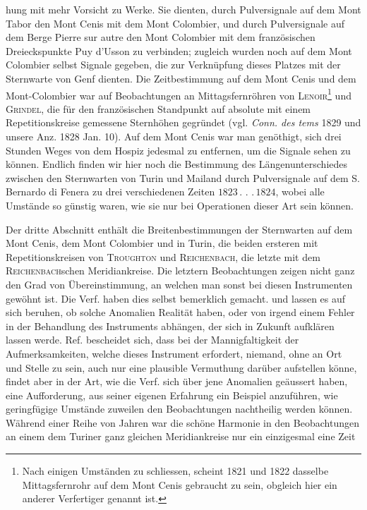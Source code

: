 %
hung mit mehr Vorsicht zu Werke. Sie dienten, durch Pulversignale auf dem Mont Tabor den Mont Cenis mit dem Mont Colombier, und durch Pulversignale auf dem Berge Pierre sur autre den Mont Colombier mit dem französischen Dreieckspunkte Puy d’Usson zu verbinden; zugleich wurden noch auf dem Mont Colombier selbst Signale gegeben, die zur Verknüpfung dieses Platzes mit der Sternwarte von Genf dienten. Die Zeitbestimmung auf dem Mont Cenis und dem Mont-Colombier war auf Beobachtungen an Mittagsfernröhren von \textsc{Lenoir}\footnote{Nach einigen Umständen zu schliessen, scheint 1821 und 1822 dasselbe Mittagsfernrohr auf dem Mont Cenis gebraucht zu sein, obgleich hier ein anderer Verfertiger genannt ist.} und \textsc{Grindel}, die für den französischen Standpunkt auf absolute mit einem Repetitionskreise gemessene Sternhöhen gegründet (vgl. \textit{Conn. des tems} 1829 und unsere Anz. 1828 Jan. 10). Auf dem Mont Cenis war man genöthigt, sich drei Stunden Weges von dem Hospiz jedesmal zu entfernen, um die Signale sehen zu können. Endlich finden wir hier noch die Bestimmung des Längenunterschiedes zwischen den Sternwarten von Turin und Mailand durch Pulversignale auf dem S. Bernardo di Fenera zu drei verschiedenen Zeiten \(1823\mathpunct{.}\mathpunct{.}\mathpunct{.}1824\), wobei alle Umstände so günstig waren, wie sie nur bei Operationen dieser Art sein können.

Der dritte Abschnitt enthält die Breitenbestimmungen der Sternwarten auf dem Mont Cenis, dem Mont Colombier und in Turin, die beiden ersteren mit Repetitionskreisen von \textsc{Troughton} und \textsc{Reichenbach}, die letzte mit dem \textsc{Reichenbach}schen Meridiankreise. Die letztern Beobachtungen zeigen nicht ganz den Grad von Übereinstimmung, an welchen man sonst bei diesen Instrumenten gewöhnt ist. Die Verf. haben dies selbst bemerklich gemacht. und lassen es auf sich beruhen, ob solche Anomalien Realität haben, oder von irgend einem Fehler in der Behandlung des Instruments abhängen, der sich in Zukunft aufklären lassen werde. Ref. bescheidet sich, dass bei der Mannigfaltigkeit der Aufmerksamkeiten, welche dieses Instrument erfordert, niemand, ohne an Ort und Stelle zu sein, auch nur eine plausible Vermuthung darüber aufstellen könne, findet aber in der Art, wie die Verf. sich über jene Anomalien geäussert haben, eine Aufforderung, aus seiner eigenen Erfahrung ein Beispiel anzuführen, wie geringfügige Umstände zuweilen den Beobachtungen nachtheilig werden können. Während einer Reihe von Jahren war die schöne Harmonie in den Beobachtungen an einem dem Turiner ganz gleichen Meridiankreise nur ein einzigesmal eine Zeit%
